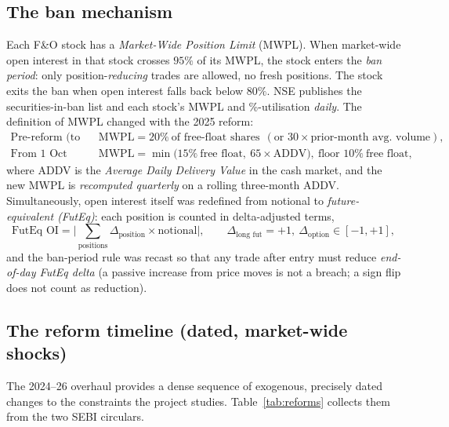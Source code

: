\subsection*{The ban mechanism}
Each F\&O stock has a \emph{Market-Wide Position Limit} (MWPL). When market-wide open interest in that stock crosses $95\%$ of its MWPL, the stock enters the \emph{ban period}: only position-\emph{reducing} trades are allowed, no fresh positions. The stock exits the ban when open interest falls back below $80\%$. NSE publishes the securities-in-ban list and each stock's MWPL and \%-utilisation \emph{daily}. The definition of MWPL changed with the 2025 reform:
\begin{align}
\text{Pre-reform (to 30 Sep 2025):}\quad & \mathrm{MWPL} = 20\%\ \text{of free-float shares} \ \ (\text{or } 30\times \text{prior-month avg.\ volume}), \label{eq:mwpl-old}\\
\text{From 1 Oct 2025:}\quad & \mathrm{MWPL} = \min\!\big(15\%\ \text{free float},\ 65\times \mathrm{ADDV}\big),\ \text{floor } 10\%\ \text{free float}, \label{eq:mwpl-new}
\end{align}
where ADDV is the \emph{Average Daily Delivery Value} in the cash market, and the new MWPL is \emph{recomputed quarterly} on a rolling three-month ADDV. Simultaneously, open interest itself was redefined from notional to \emph{future-equivalent (FutEq)}: each position is counted in delta-adjusted terms,
\begin{equation}
\text{FutEq OI} = \Big|\textstyle\sum_{\text{positions}} \Delta_{\text{position}}\times \text{notional}\Big|, \qquad \Delta_{\text{long fut}}=+1,\ \Delta_{\text{option}}\in[-1,+1], \label{eq:futeq}
\end{equation}
and the ban-period rule was recast so that any trade after entry must reduce \emph{end-of-day FutEq delta} (a passive increase from price moves is not a breach; a sign flip does not count as reduction).

\subsection*{The reform timeline (dated, market-wide shocks)}
The 2024--26 overhaul provides a dense sequence of exogenous, precisely dated changes to the constraints the project studies. Table~\ref{tab:reforms} collects them from the two SEBI circulars.

